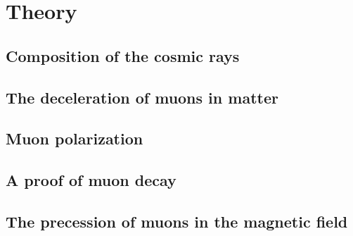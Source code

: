 \chapter{Theory}
\section{Composition of the cosmic rays}
\section{The deceleration of muons in matter}
\section{Muon polarization}
\section{A proof of muon decay}
\section{The precession of muons in the magnetic field}